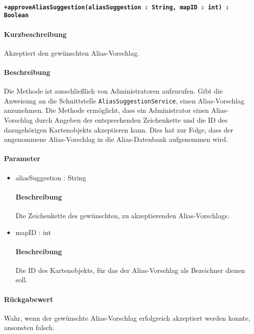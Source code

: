 \paragraph*{\texttt{+approveAliasSuggestion(aliasSuggestion : String, mapID : int) : Boolean}}%
\paragraph*{Kurzbeschreibung}
Akzeptiert den gewünschten Alias-Vorschlag.
\paragraph*{Beschreibung}
Die Methode ist ausschließlich von Administratoren aufzurufen.
Gibt die Anweisung an die Schnittstelle \texttt{AliasSuggestionService}, einen Alias-Vorschlag anzunehmen.
Die Methode ermöglicht, dass ein Administrator einen Alias-Vorschlag durch Angeben der entsprechenden Zeichenkette und die ID des dazugehörigen Kartenobjekts akzeptieren kann.
Dies hat zur Folge, dass der angenommene Alias-Vorschlag in die Alias-Datenbank aufgenommen wird.
\paragraph*{Parameter}
\begin{itemize}
	\item aliasSuggestion : String
		\paragraph*{Beschreibung}
		Die Zeichenkette des gewünschten, zu akzeptierenden Alias-Vorschlags.
	\item mapID : int
		\paragraph*{Beschreibung}
		Die ID des Kartenobjekts, für das der Alias-Vorschlag als Bezeichner dienen soll.
\end{itemize}
\paragraph*{Rückgabewert}
Wahr, wenn der gewünschte Alias-Vorschlag erfolgreich akzeptiert werden konnte, ansonsten falsch.
